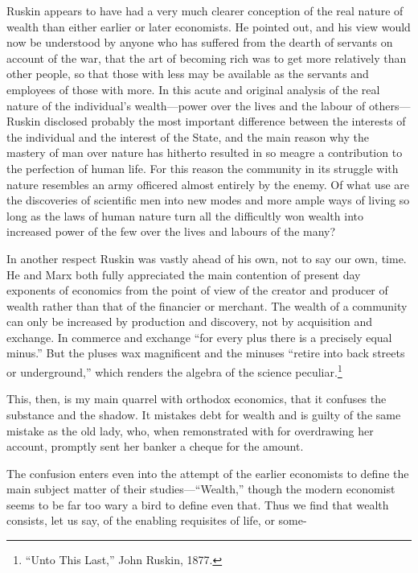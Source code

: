 \documentclass[10.5pt,twoside]{book}
\newcommand{\origpage}[1]{\clearpage\setcounter{page}{#1}}
\begin{document}
\origpage{15}

Ruskin appears to have had a very much clearer conception of the real nature
of wealth than either earlier or later economists. He pointed out, and his
view would now be understood by anyone who has suffered from the dearth of
servants on account of the war, that the art of becoming rich was to get more
relatively than other people, so that those with less may be available as the
servants and employees of those with more. In this acute and original analysis
of the real nature of the individual's wealth---power over the lives and the
labour of others---Ruskin disclosed probably the most important difference
between the interests of the individual and the interest of the State, and the
main reason why the mastery of man over nature has hitherto resulted in so
meagre a contribution to the perfection of human life. For this reason the
community in its struggle with nature resembles an army officered almost
entirely by the enemy. Of what use are the discoveries of scientific men into
new modes and more ample ways of living so long as the laws of human nature
turn all the difficultly won wealth into increased power of the few over the
lives and labours of the many?

In another respect Ruskin was vastly ahead of his own, not to say our own,
time. He and Marx both fully appreciated the main contention of present day
exponents of economics from the point of view of the creator and producer of
wealth rather than that of the financier or merchant. The wealth of a
community can only be increased by production and discovery, not by
acquisition and exchange. In commerce and exchange ``for every plus there is a
precisely equal minus.'' But the pluses wax magnificent and the minuses
``retire into back streets or underground,'' which renders the algebra of the
science peculiar.\footnote{``Unto This Last,'' John Ruskin, 1877.}

This, then, is my main quarrel with orthodox economics, that it confuses the
substance and the shadow. It mistakes debt for wealth and is guilty of the
same mistake as the old lady, who, when remonstrated with for overdrawing her
account, promptly sent her banker a cheque for the amount.

The confusion enters even into the attempt of the earlier economists to define
the main subject matter of their studies---``Wealth,'' though the modern
economist seems to be far too wary a bird to define even that. Thus we find
that wealth consists, let us say, of the enabling requisites of life, or some-
\end{document}

